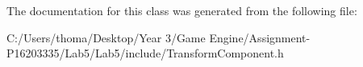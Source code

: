 The documentation for this class was generated from the following file\+:\begin{DoxyCompactItemize}
\item 
C\+:/\+Users/thoma/\+Desktop/\+Year 3/\+Game Engine/\+Assignment-\/\+P16203335/\+Lab5/\+Lab5/include/Transform\+Component.\+h\end{DoxyCompactItemize}
